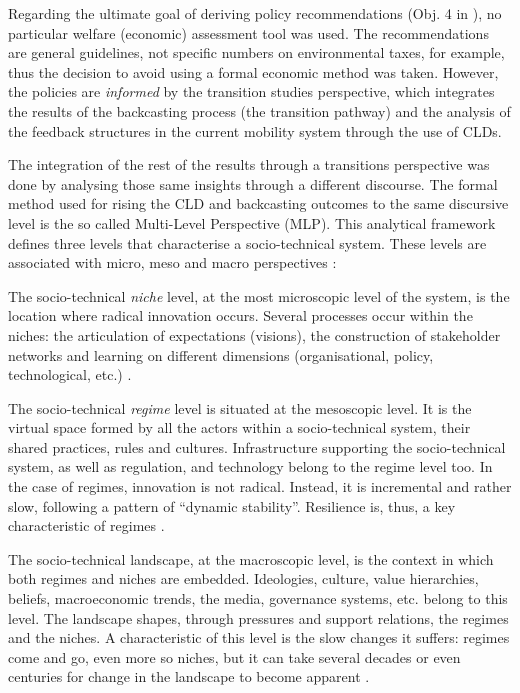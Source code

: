 Regarding the ultimate goal of deriving policy recommendations (Obj. 4 in ), no particular welfare (economic) assessment tool was used. The recommendations are general guidelines, not specific numbers on environmental taxes, for example, thus the decision to avoid using a formal economic method was taken. However, the policies are \emph{informed} by the transition studies perspective, which integrates the results of the backcasting process (the transition pathway) and the analysis of the feedback structures in the current mobility system through the use of CLDs.

The integration of the rest of the results through a transitions perspective was done by analysing those same insights through a different discourse. The formal method used for rising the CLD and backcasting outcomes to the same discursive level is the so called Multi-Level Perspective (MLP). This analytical framework defines three levels that characterise a socio-technical system. These levels are associated with micro, meso and macro perspectives \parencite{geels2001_Technologicaltransitionsas,rotmans2001_Moreevolutionthan}:
\begin{enumeratealpha}
\item The socio-technical \emph{niche} level, at the most microscopic level of the system, is the location where radical innovation occurs. Several processes occur within the niches: the articulation of expectations (visions), the construction of stakeholder networks and learning on different dimensions (organisational, policy, technological, etc.) \parencite{geels2012_MultiLevelPerspective}.
\item The socio-technical \emph{regime} level is situated at the mesoscopic level. It is the virtual space formed by all the actors within a socio-technical system, their shared practices, rules and cultures. Infrastructure supporting the socio-technical system, as well as regulation, and technology belong to the regime level too. In the case of regimes, innovation is not radical. Instead, it is incremental and rather slow, following a pattern of ``dynamic stability''. Resilience is, thus, a key characteristic of regimes \parencite{geels2012_MultiLevelPerspective}.
\item The socio-technical landscape, at the macroscopic level, is the context in which both regimes and niches are embedded. Ideologies, culture, value hierarchies, beliefs, macroeconomic trends, the media, governance systems, etc. belong to this level. The landscape shapes, through pressures and support relations, the regimes and the niches. A characteristic of this level is the slow changes it suffers: regimes come and go, even more so niches, but it can take several decades or even centuries for change in the landscape to become apparent \parencite{rotmans2001_Moreevolutionthan,kemp2007_Transitionmanagementas,geels2012_MultiLevelPerspective}.
\end{enumeratealpha}

